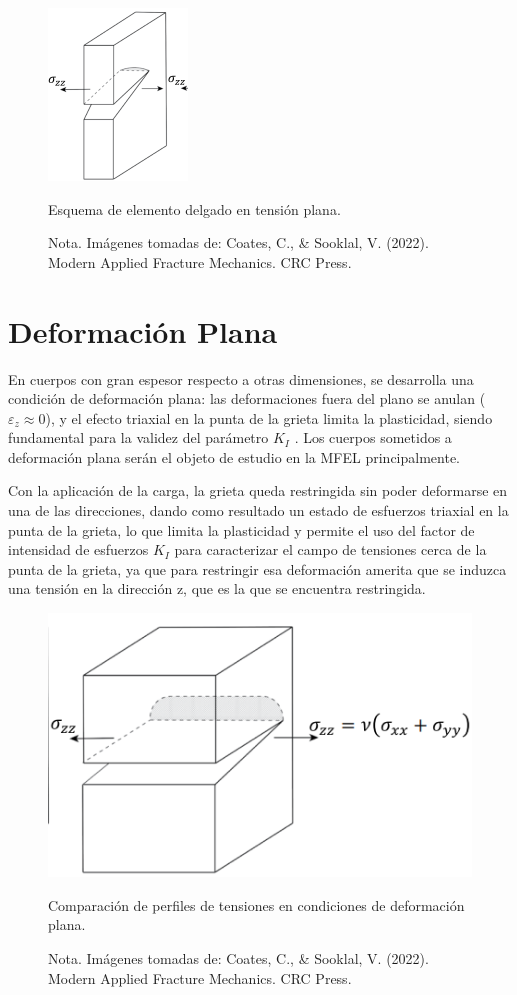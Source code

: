 \documentclass[12pt,letterpaper]{article}
\begin{document}
\begin{figure}[H]   
    \centering
    \includegraphics[width=0.3\linewidth]{BB.png} %
    \caption{Esquema de elemento delgado en tensión plana.}
    \label{fig:tension_plana}
    \caption*{Nota. Imágenes tomadas de: Coates, C., \& Sooklal, V. (2022). Modern Applied Fracture Mechanics. CRC Press.}
\end{figure}

\section{Deformación Plana}

En cuerpos con gran espesor respecto a otras dimensiones, se desarrolla una condición de deformación plana: las deformaciones fuera del plano se anulan ($\varepsilon_z \approx 0$), y el efecto triaxial en la punta de la grieta limita la plasticidad, siendo fundamental para la validez del parámetro $K_I$ \cite{Cameron2022, Ponson2022, Broek1982, Jaramillo2008}.
Los cuerpos sometidos a deformación plana serán el objeto de estudio en la MFEL principalmente.

Con la aplicación de la carga, la grieta queda restringida sin poder deformarse en una de las direcciones, dando como resultado un estado de esfuerzos triaxial en la punta de la grieta, lo que limita la plasticidad y permite el uso del factor de intensidad de esfuerzos $K_I$ para caracterizar el campo de tensiones cerca de la punta de la grieta, ya que para restringir esa deformación amerita que se induzca una tensión en la dirección z, que es la que se encuentra restringida.
\vspace{1em}
\begin{figure}[H]
    \centering
    \includegraphics[width=0.4\linewidth]{ss.png} %
    \caption{Comparación de perfiles de tensiones en condiciones de deformación plana.}
    \label{fig:deformacion_plana}
    \caption*{Nota. Imágenes tomadas de: Coates, C., \& Sooklal, V. (2022). Modern Applied Fracture Mechanics. CRC Press.}
\end{figure}
\end{document}
